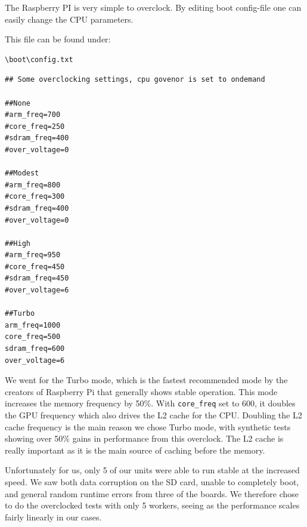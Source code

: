 The Raspberry PI is very simple to overclock. By editing boot config-file one can easily change the CPU parameters.

This file can be found under:

\begin{lstlisting}
\boot\config.txt
\end{lstlisting}

\begin{lstlisting}
## Some overclocking settings, cpu govenor is set to ondemand

##None
#arm_freq=700
#core_freq=250
#sdram_freq=400
#over_voltage=0

##Modest
#arm_freq=800
#core_freq=300
#sdram_freq=400
#over_voltage=0

##High
#arm_freq=950
#core_freq=450
#sdram_freq=450
#over_voltage=6

##Turbo
arm_freq=1000
core_freq=500
sdram_freq=600
over_voltage=6
\end{lstlisting}

We went for the Turbo mode, which is the fastest recommended mode by the creators of Raspberry Pi that generally shows stable operation.
This mode increases the memory frequency by 50\%.  With {\tt core\_freq} set to 600, it doubles the GPU frequency which also drives the L2 cache for the CPU.
Doubling the L2 cache frequency is the main reason we chose Turbo mode, with synthetic tests showing over 50\% gains in performance\cite{overclock} from this overclock.
The L2 cache is really important as it is the main source of caching before the memory.

Unfortunately for us, only 5 of our units were able to run stable at the increased speed.
We saw both data corruption on the SD card, unable to completely boot, and general random runtime errors from three of the boards.
We therefore chose to do the overclocked tests with only 5 workers, seeing as the performance scales fairly linearly in our cases.
